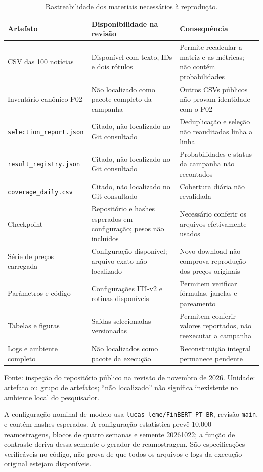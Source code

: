 \begin{table}[htbp]
\centering
\caption{Rastreabilidade dos materiais necessários à reprodução.}
\label{tab:artefatos-reproducao}
\begin{tabularx}{\textwidth}{@{}P{0.29\textwidth}L L@{}}
\toprule
Artefato & Disponibilidade na revisão & Consequência \\
\midrule
CSV das 100 notícias & Disponível com texto, IDs e dois rótulos & Permite recalcular a matriz e as métricas; não contém probabilidades \\
Inventário canônico P02 & Não localizado como pacote completo da campanha & Outros CSVs públicos não provam identidade com o P02 \\
\texttt{selection\_\allowbreak{}report.json} & Citado, não localizado no Git consultado & Deduplicação e seleção não reauditadas linha a linha \\
\texttt{result\_\allowbreak{}registry.json} & Citado, não localizado no Git consultado & Probabilidades e status da campanha não recontados \\
\texttt{coverage\_\allowbreak{}daily.csv} & Citado, não localizado no Git consultado & Cobertura diária não revalidada \\
Checkpoint & Repositório e hashes esperados em configuração; pesos não incluídos & Necessário conferir os arquivos efetivamente usados \\
Série de preços carregada & Configuração disponível; arquivo exato não localizado & Novo download não comprova reprodução dos preços originais \\
Parâmetros e código & Configurações ITI-v2 e rotinas disponíveis & Permitem verificar fórmulas, janelas e pareamento \\
Tabelas e figuras & Saídas selecionadas versionadas & Permitem conferir valores reportados, não reexecutar a campanha \\
Logs e ambiente completo & Não localizados como pacote da execução & Reconstituição integral permanece pendente \\
\bottomrule
\end{tabularx}
\par\smallskip
{\footnotesize Fonte: inspeção do repositório público na revisão de novembro de 2026. Unidade: artefato ou grupo de artefatos; ``não localizado'' não significa inexistente no ambiente local do pesquisador.}
\end{table}

A configuração nominal de modelo usa \texttt{lucas-leme/FinBERT-PT-BR}, revisão \texttt{main}, e contém hashes esperados. A configuração estatística prevê 10.000 reamostragens, blocos de quatro semanas e semente 20261022; a função de contraste deriva dessa semente o gerador de reamostragem. São especificações verificáveis no código, não prova de que todos os arquivos e logs da execução original estejam disponíveis.

